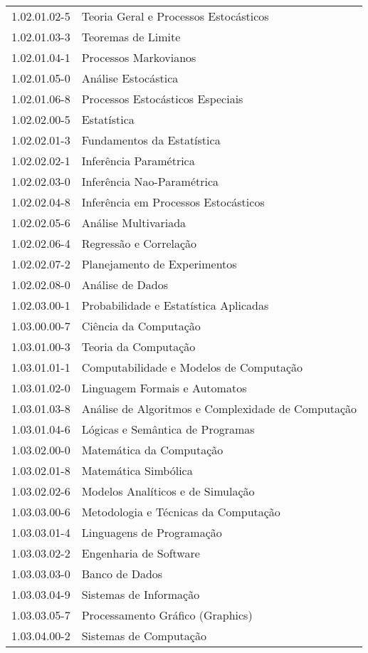 \begin{longtable}[c]{p{2.15cm}p{13cm}}
1.02.01.02-5 & Teoria Geral e Processos Estocásticos \\
1.02.01.03-3 & Teoremas de Limite \\
1.02.01.04-1 & Processos Markovianos \\
1.02.01.05-0 & Análise Estocástica \\
1.02.01.06-8 & Processos Estocásticos Especiais \\
1.02.02.00-5 & Estatística \\
1.02.02.01-3 & Fundamentos da Estatística \\
1.02.02.02-1 & Inferência Paramétrica \\
1.02.02.03-0 & Inferência Nao-Paramétrica \\
1.02.02.04-8 & Inferência em Processos Estocásticos \\
1.02.02.05-6 & Análise Multivariada \\
1.02.02.06-4 & Regressão e Correlação \\
1.02.02.07-2 & Planejamento de Experimentos \\
1.02.02.08-0 & Análise de Dados \\
1.02.03.00-1 & Probabilidade e Estatística Aplicadas \\
1.03.00.00-7 & Ciência da Computação \\
1.03.01.00-3 & Teoria da Computação \\
1.03.01.01-1 & Computabilidade e Modelos de Computação \\
1.03.01.02-0 & Linguagem Formais e Automatos \\
1.03.01.03-8 & Análise de Algoritmos e Complexidade de Computação \\
1.03.01.04-6 & Lógicas e Semântica de Programas \\
1.03.02.00-0 & Matemática da Computação \\
1.03.02.01-8 & Matemática Simbólica \\
1.03.02.02-6 & Modelos Analíticos e de Simulação \\
1.03.03.00-6 & Metodologia e Técnicas da Computação \\
1.03.03.01-4 & Linguagens de Programação \\
1.03.03.02-2 & Engenharia de Software \\
1.03.03.03-0 & Banco de Dados \\
1.03.03.04-9 & Sistemas de Informação \\
1.03.03.05-7 & Processamento Gráfico (Graphics) \\
1.03.04.00-2 & Sistemas de Computação \\

\end{longtable}
